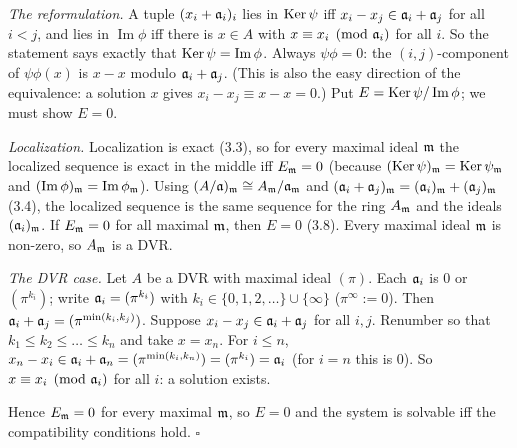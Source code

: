 \documentclass[11pt]{article}
\begin{document}
\pf
\emph{The reformulation.} A tuple $(x_i+\mathfrak a_i)_i$ lies in $\operatorname{Ker}\psi$ iff $x_i-x_j\in\mathfrak a_i+\mathfrak a_j$ for all $i<j$, and lies in $\operatorname{Im}\phi$ iff there is $x\in A$ with $x\equiv x_i\pmod{\mathfrak a_i}$ for all $i$. So the statement says exactly that $\operatorname{Ker}\psi=\operatorname{Im}\phi$. Always $\psi\phi=0$: the $(i,j)$-component of $\psi\phi(x)$ is $x-x$ modulo $\mathfrak a_i+\mathfrak a_j$. (This is also the easy direction of the equivalence: a solution $x$ gives $x_i-x_j\equiv x-x=0$.) Put $E=\operatorname{Ker}\psi/\operatorname{Im}\phi$; we must show $E=0$.

\emph{Localization.} Localization is exact (3.3), so for every maximal ideal $\mathfrak m$ the localized sequence is exact in the middle iff $E_\mathfrak m=0$ (because $(\operatorname{Ker}\psi)_\mathfrak m=\operatorname{Ker}\psi_\mathfrak m$ and $(\operatorname{Im}\phi)_\mathfrak m=\operatorname{Im}\phi_\mathfrak m$). Using $(A/\mathfrak a)_\mathfrak m\cong A_\mathfrak m/\mathfrak a_\mathfrak m$ and $(\mathfrak a_i+\mathfrak a_j)_\mathfrak m=(\mathfrak a_i)_\mathfrak m+(\mathfrak a_j)_\mathfrak m$ (3.4), the localized sequence is the same sequence for the ring $A_\mathfrak m$ and the ideals $(\mathfrak a_i)_\mathfrak m$. If $E_\mathfrak m=0$ for all maximal $\mathfrak m$, then $E=0$ (3.8). Every maximal ideal $\mathfrak m$ is non-zero, so $A_\mathfrak m$ is a DVR.

\emph{The DVR case.} Let $A$ be a DVR with maximal ideal $(\pi)$. Each $\mathfrak a_i$ is $0$ or $(\pi^{k_i})$; write $\mathfrak a_i=(\pi^{k_i})$ with $k_i\in\{0,1,2,\dots\}\cup\{\infty\}$ ($\pi^\infty:=0$). Then $\mathfrak a_i+\mathfrak a_j=(\pi^{\min(k_i,k_j)})$. Suppose $x_i-x_j\in\mathfrak a_i+\mathfrak a_j$ for all $i,j$. Renumber so that $k_1\le k_2\le\dots\le k_n$ and take $x=x_n$. For $i\le n$, $x_n-x_i\in\mathfrak a_i+\mathfrak a_n=(\pi^{\min(k_i,k_n)})=(\pi^{k_i})=\mathfrak a_i$ (for $i=n$ this is $0$). So $x\equiv x_i\pmod{\mathfrak a_i}$ for all $i$: a solution exists.

Hence $E_\mathfrak m=0$ for every maximal $\mathfrak m$, so $E=0$ and the system is solvable iff the compatibility conditions hold. \hfill$\square$
\end{document}
